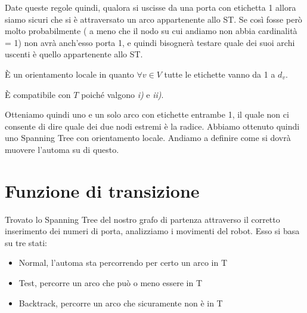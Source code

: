 Date queste regole quindi, qualora si uscisse da una porta con etichetta 1
allora siamo sicuri che si è attraversato un arco appartenente allo ST. Se così
fosse però molto probabilmente ( a meno che il nodo su cui andiamo non abbia
cardinalità = 1) non avrà anch'esso porta 1, e quindi bisognerà testare quale
dei suoi archi uscenti è quello appartenente allo ST.
\newpage
{}

È un orientamento locale in quanto $\forall v \in V$ tutte le etichette vanno da
1 a $d_v$.

È compatibile con $T$ poiché valgono \textit{i)} e \textit{ii)}.

Otteniamo quindi uno e un solo arco con etichette entrambe 1, il quale non ci
consente di dire quale dei due nodi estremi è la radice. Abbiamo ottenuto quindi
uno Spanning Tree con orientamento locale. Andiamo a definire come si dovrà
muovere l'automa su di questo.

\section{Funzione di transizione}
Trovato lo Spanning Tree del nostro grafo di partenza attraverso il corretto
inserimento dei numeri di porta, analizziamo i movimenti del robot. Esso si basa
su tre stati:
\begin{itemize}
    \item Normal, l'automa sta percorrendo per certo un arco in T
    \item Test, percorre un arco che può o meno essere in T
    \item Backtrack, percorre un arco che sicuramente non è in T
\end{itemize}
